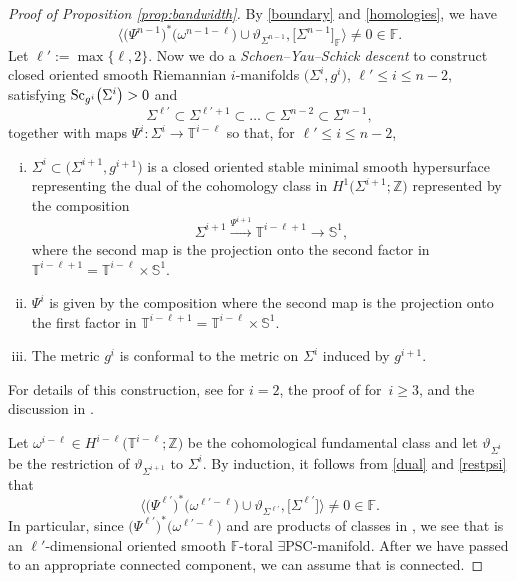 \documentclass[pdftex]{sigma}
\numberwithin{equation}{section}
\newcommand{\F}{\mathbb{F}}
\newcommand{\Z}{\mathbb{Z}}
\newcommand{\SSS}{\mathbb{S}}
\newcommand{\TTT}{\mathbb{T}}
\newcommand{\Sc}{{\rm Sc}}
\newcommand{\yes}{{\color {blue!70!black}$\exists$}{\sf PSC}}
\begin{document}
\begin{proof}[Proof of Proposition \ref{prop:bandwidth}]
By \eqref{boundary} and \eqref{homologies}, we have
\[
 \big\langle \big( \Psi^{n-1}\big)^* \big(\omega^{n-1-\ell}\big) \cup \vartheta_{\Sigma^{n-1}} , \big[\Sigma^{n-1}\big]_\F \big\rangle \neq 0 \in \F.
\]
Let $\ell' := \max\{ \ell, 2\}$.
Now we do a {\em Schoen--Yau--Schick descent} to construct closed oriented smooth Riemannian $i$-manifolds $\big(\Sigma^i, g^i\big)$, $\ell' \leq i \leq n-2$, satisfying $\Sc_{g^i} \big( \Sigma^i\big)> 0$ and
\[
 \Sigma^{\ell'} \subset \Sigma^{\ell'+1} \subset \dots \subset \Sigma^{n-2} \subset \Sigma^{n-1} ,
\]
together with maps $ \Psi^i \colon \Sigma^{i} \to {\TTT}^{i - \ell}$ so that, for $\ell' \leq i \leq n-2$,
\begin{enumerate}[(i)]\itemsep=0pt
 \item \label{dual} $\Sigma^{i} \subset \big(\Sigma^{i+1}, g^{i+1}\big)$ is a closed oriented stable minimal smooth hypersurface representing the dual of the cohomology class in $H^1\big(\Sigma^{i+1}; \Z\big)$ represented by the composition
 \[
 \Sigma^{i+1} \stackrel{\Psi^{i+1}}{\longrightarrow} {\TTT}^{i-\ell+1}\longrightarrow \SSS^1,
 \]
 where the second map is the projection onto the second factor in ${\TTT}^{i-\ell+1} = {\TTT}^{i-\ell} \times \SSS^1$.
 \item \label{restpsi} $\Psi^i$ is given by the composition
 \smash{$
 \Psi^{i} \colon\ \Sigma^{i} \stackrel{\Psi^{i+1}}{\longrightarrow} {\TTT}^{i-\ell+1} \longrightarrow {\TTT}^{i-\ell}
 $}
 where the second map is the projection onto the first factor in ${\TTT}^{i-\ell+1} = {\TTT}^{i-\ell} \times \SSS^1$.
 \item The metric $g^i$ is conformal to the metric on $\Sigma^i$ induced by $g^{i+1}$.
 \end{enumerate}
 For details of this construction, see \cite[Theorem 5.1]{S-Y1979} for $i =2$, the proof of \cite[Theorem 1]{SY} for~${i \geq 3}$, and the discussion in \cite{Sch98}.


 Let $\omega^{i-\ell} \in H^{i - \ell}\big( {\TTT}^{i-\ell}; \Z\big)$ be the cohomological fundamental class and let $\vartheta_{\Sigma^{i}}$ be the restriction of $\vartheta_{\Sigma^{i+1}}$ to $\Sigma^i$.
By induction, it follows from \ref{dual} and \ref{restpsi} that
\[
 \big\langle \big(\Psi^{\ell'}\big)^* \big(\omega^{\ell'-\ell}\big) \cup \vartheta_{\Sigma^{\ell'}} , \big[\Sigma^{\ell'}\big] \big\rangle \neq 0 \in \F.
 \]
 In particular, since $\big(\Psi^{\ell'}\big)^* \big(\omega^{\ell'-\ell}\big)$ and  are products of classes in \smash{$H^1\big( \Sigma^{\ell'} ; \F\big)$}, we see that  is an $\ell'$-dimensional oriented smooth $\F$-toral \yes-manifold.
After we have passed to an appropriate connected component, we can assume that  is connected.


\end{proof}
\end{document}
